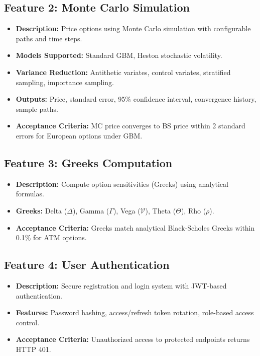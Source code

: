 \documentclass[12pt,a4paper]{report}
\begin{document}
\subsection{Feature 2: Monte Carlo Simulation}

\begin{itemize}
    \item \textbf{Description:} Price options using Monte Carlo simulation with configurable paths and time steps.
    \item \textbf{Models Supported:} Standard GBM, Heston stochastic volatility.
    \item \textbf{Variance Reduction:} Antithetic variates, control variates, stratified sampling, importance sampling.
    \item \textbf{Outputs:} Price, standard error, 95\% confidence interval, convergence history, sample paths.
    \item \textbf{Acceptance Criteria:} MC price converges to BS price within 2 standard errors for European options under GBM.
\end{itemize}

\subsection{Feature 3: Greeks Computation}

\begin{itemize}
    \item \textbf{Description:} Compute option sensitivities (Greeks) using analytical formulas.
    \item \textbf{Greeks:} Delta ($\Delta$), Gamma ($\Gamma$), Vega ($\mathcal{V}$), Theta ($\Theta$), Rho ($\rho$).
    \item \textbf{Acceptance Criteria:} Greeks match analytical Black-Scholes Greeks within 0.1\% for ATM options.
\end{itemize}

\subsection{Feature 4: User Authentication}

\begin{itemize}
    \item \textbf{Description:} Secure registration and login system with JWT-based authentication.
    \item \textbf{Features:} Password hashing, access/refresh token rotation, role-based access control.
    \item \textbf{Acceptance Criteria:} Unauthorized access to protected endpoints returns HTTP 401.
\end{itemize}
\end{document}
